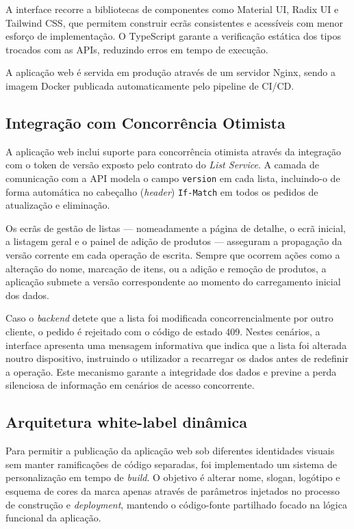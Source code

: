 A interface recorre a bibliotecas de componentes como Material UI, Radix UI e Tailwind CSS, que permitem construir ecrãs consistentes e acessíveis com menor esforço de implementação. O TypeScript garante a verificação estática dos tipos trocados com as APIs, reduzindo erros em tempo de execução.

A aplicação web é servida em produção através de um servidor Nginx, sendo a imagem Docker publicada automaticamente pelo pipeline de \ac{CI/CD}.

\subsection{Integração com Concorrência Otimista}
\label{sec:4.5.1}

A aplicação web inclui suporte para concorrência otimista através da integração com o token de versão exposto pelo contrato do \textit{List Service}. A camada de comunicação com a API modela o campo \texttt{version} em cada lista, incluindo-o de forma automática no cabeçalho (\textit{header}) \texttt{If-Match} em todos os pedidos de atualização e eliminação.

Os ecrãs de gestão de listas — nomeadamente a página de detalhe, o ecrã inicial, a listagem geral e o painel de adição de produtos — asseguram a propagação da versão corrente em cada operação de escrita. Sempre que ocorrem ações como a alteração do nome, marcação de itens, ou a adição e remoção de produtos, a aplicação submete a versão correspondente ao momento do carregamento inicial dos dados. 

Caso o \textit{backend} detete que a lista foi modificada concorrencialmente por outro cliente, o pedido é rejeitado com o código de estado 409. Nestes cenários, a interface apresenta uma mensagem informativa que indica que a lista foi alterada noutro dispositivo, instruindo o utilizador a recarregar os dados antes de redefinir a operação. Este mecanismo garante a integridade dos dados e previne a perda silenciosa de informação em cenários de acesso concorrente.
\subsection{Arquitetura white-label dinâmica}
\label{sec:4.5.2}

Para permitir a publicação da aplicação web sob diferentes identidades visuais sem manter ramificações de código separadas, foi implementado um sistema de personalização em tempo de \textit{build}. O objetivo é alterar nome, slogan, logótipo e esquema de cores da marca apenas através de parâmetros injetados no processo de construção e \textit{deployment}, mantendo o código-fonte partilhado focado na lógica funcional da aplicação.

